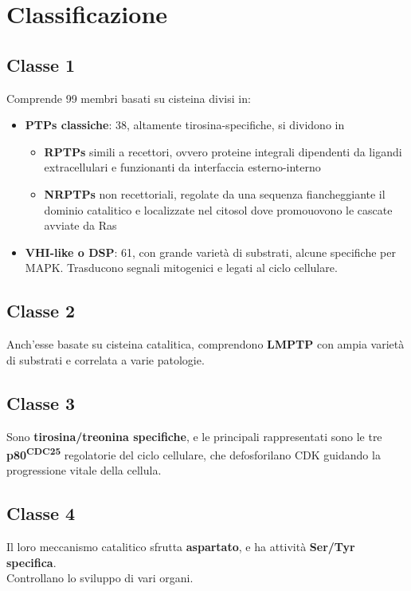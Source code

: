 \documentclass[a4paper, 12pt]{article}
\begin{document}
\section{Classificazione}

\subsection{Classe 1}
Comprende 99 membri basati su cisteina divisi in:
\begin{itemize}
  \item \textbf{PTPs classiche}: 38, altamente tirosina-specifiche, si dividono in \begin{itemize}
    \item \textbf{RPTPs} simili a recettori, ovvero proteine integrali dipendenti da ligandi extracellulari e funzionanti da interfaccia esterno-interno
    \item \textbf{NRPTPs} non recettoriali, regolate da una sequenza fiancheggiante il dominio catalitico e localizzate nel citosol dove promouovono le cascate avviate da Ras
  \end{itemize}
  \item \textbf{VHI-like o DSP}: 61, con grande varietà di substrati, alcune specifiche per MAPK. Trasducono segnali mitogenici e legati al ciclo cellulare.
\end{itemize}

\subsection{Classe 2}
Anch'esse basate su cisteina catalitica, comprendono \textbf{LMPTP} con ampia varietà di substrati e correlata a varie patologie.

\subsection{Classe 3}
Sono \textbf{tirosina/treonina specifiche}, e le principali rappresentati sono le tre \textbf{p80\textsuperscript{CDC25}} regolatorie del ciclo cellulare, che defosforilano CDK guidando la progressione vitale della cellula.

\subsection{Classe 4}
Il loro meccanismo catalitico sfrutta \textbf{aspartato}, e ha attività \textbf{Ser/Tyr specifica}.\\
Controllano lo sviluppo di vari organi.
\end{document}
